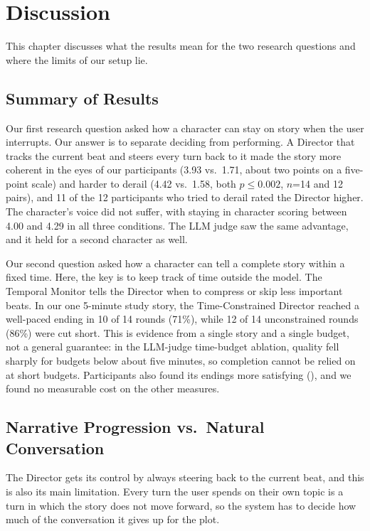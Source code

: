 \chapter{Discussion}\label{sec:discussion}

This chapter discusses what the results mean for the two research questions and where the limits of our setup lie.


\section{Summary of Results}\label{sec:summary}

Our first research question asked how a character can stay on story when the user interrupts. Our answer is to separate deciding from performing. A Director that tracks the current beat and steers every turn back to it made the story more coherent in the eyes of our participants (3.93 vs.\ 1.71, about two points on a five-point scale) and harder to derail (4.42 vs.\ 1.58, both $p \le 0.002$, $n$=14 and 12 pairs), and 11 of the 12 participants who tried to derail rated the Director higher. The character's voice did not suffer, with staying in character scoring between 4.00 and 4.29 in all three conditions. The LLM judge saw the same advantage, and it held for a second character as well.

Our second question asked how a character can tell a complete story within a fixed time. Here, the key is to keep track of time outside the model. The Temporal Monitor tells the Director when to compress or skip less important beats. In our one 5-minute study story, the Time-Constrained Director reached a well-paced ending in 10 of 14 rounds (71\%), while 12 of 14 unconstrained rounds (86\%) were cut short. This is evidence from a single story and a single budget, not a general guarantee: in the LLM-judge time-budget ablation, quality fell sharply for budgets below about five minutes, so completion cannot be relied on at short budgets. Participants also found its endings more satisfying (), and we found no measurable cost on the other measures.



\section{Narrative Progression vs.\ Natural Conversation}\label{sec:tradeoff}

The Director gets its control by always steering back to the current beat, and this is also its main limitation. Every turn the user spends on their own topic is a turn in which the story does not move forward, so the system has to decide how much of the conversation it gives up for the plot.

